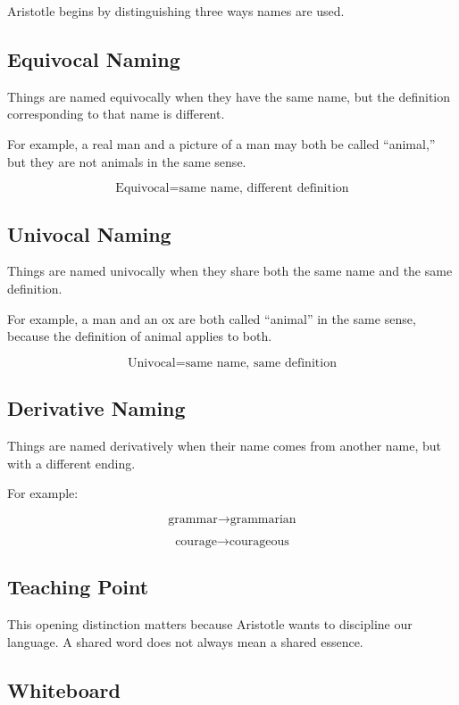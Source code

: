 \documentclass[12pt]{article}
\begin{document}
Aristotle begins by distinguishing three ways names are used.

\subsection*{Equivocal Naming}

Things are named equivocally when they have the same name, but the definition
corresponding to that name is different.

For example, a real man and a picture of a man may both be called ``animal,''
but they are not animals in the same sense.

\[
\text{Equivocal} = \text{same name, different definition}
\]

\subsection*{Univocal Naming}

Things are named univocally when they share both the same name and the same
definition.

For example, a man and an ox are both called ``animal'' in the same sense,
because the definition of animal applies to both.

\[
\text{Univocal} = \text{same name, same definition}
\]

\subsection*{Derivative Naming}

Things are named derivatively when their name comes from another name, but with
a different ending.

For example:

\[
\text{grammar} \rightarrow \text{grammarian}
\]

\[
\text{courage} \rightarrow \text{courageous}
\]

\subsection*{Teaching Point}

This opening distinction matters because Aristotle wants to discipline our
language. A shared word does not always mean a shared essence.

\subsection*{Whiteboard}
\end{document}
